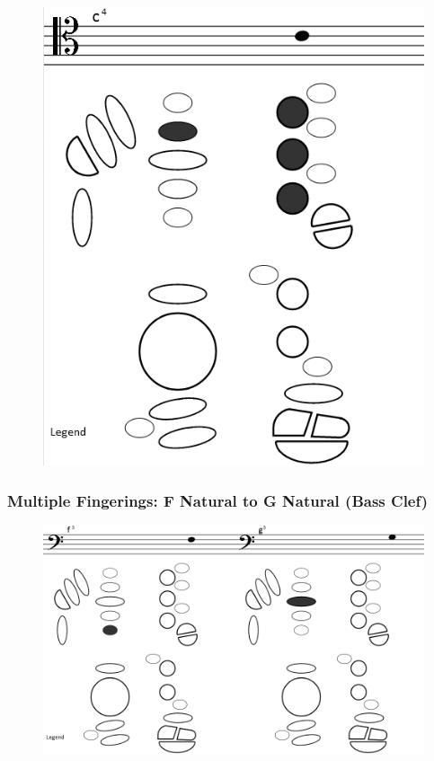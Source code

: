 \documentclass[12pt,english]{article}
\begin{document}
\begin{figure}[H]
\caption{}


\centering{}\includegraphics[scale=0.6]{fingering1}
\end{figure}



\subsubsection{Multiple Fingerings: F Natural to G Natural (Bass Clef)}

\begin{figure}[H]
\caption{}


\includegraphics[scale=0.45]{multifingerings}

\end{figure}
\end{document}
